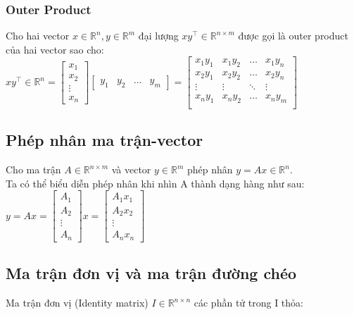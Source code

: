 \subsubsection{Outer Product}
Cho hai vector $x \in \mathbb{R}^n, y \in \mathbb{R}^{m}$ đại lượng $xy^\top \in \mathbb{R} ^{n \times m}$ được gọi là outer product của hai vector sao cho:\\
$xy^\top \in \mathbb{R} ^{n} =
\left[\begin{matrix}
x_1 \\
x_2 \\
\vdots\\
x_n
\end{matrix}\right] \left[\begin{matrix}y_1 & y_2 & \dots & y_m\end{matrix}\right]
= 
\left[\begin{matrix}
x_1y_1 & x_1y_2 & \dots & x_1y_n\\
x_2y_1 & x_2y_2 & \dots & x_2y_n\\
\vdots & \vdots & \ddots & \vdots \\
x_ny_1 & x_ny_2 & \dots & x_ny_m \\ 
\end{matrix}\right]
$
\subsection{Phép nhân ma trận-vector}
Cho ma trận $A \in \mathbb{R} ^{n \times m}$ và vector $y \in \mathbb{R}^{m}$ phép nhân $y = Ax \in \mathbb{R}^{n}$.\\
Ta có thể biểu diễn phép nhân khi nhìn A thành dạng hàng như sau:\\
$
y = Ax = 
\left[\begin{matrix}
A_1 \\
A_2 \\ 
\vdots \\
A_n
\end{matrix}\right]x =
\left[\begin{matrix}
A_1x_1\\
A_2x_2 \\ 
\vdots \\
A_nx_n
\end{matrix}\right]
$

\subsection{Ma trận đơn vị và ma trận đường chéo}
Ma trận đơn vị (Identity matrix) $I \in \mathbb{R}^{n \times n}$ các phần tử trong I thỏa:\\


